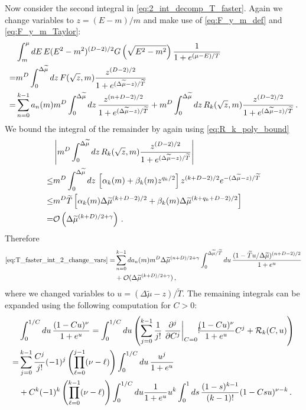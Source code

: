 \documentclass[sn-mathphys,Numbered]{sn-jnl}
\begin{document}
Now consider the second integral in \eqref{eq:2_int_decomp_T_faster}. Again we change variables to $z=(E-m)/m$ and make use of \eqref{eq:F_y_m_def} and \eqref{eq:F_y_m_Taylor}:
\begin{align}\label{eq:T_faster_int_2_change_vars} 
  &\int_m^{\mu} dE \,E(E^2-m^2)^{(D-2)/2} G\left(\sqrt{E^2-m^2}\right)\frac{1}{1+e^{(\mu-E)/T}} \\\notag
  =&m^{D}\int_0^{\Delta\widetilde{\mu}} dz \, F(\sqrt{z},m)\frac{z^{(D-2)/2}}{1+e^{(\Delta\widetilde{\mu}-z)/\widetilde{T}}}\notag\\
  =&\sum_{n=0}^{k-1} a_n(m)m^{D}\int_0^{\Delta\widetilde{\mu}} dz \,\frac{z^{(n+D-2)/2}}{1+e^{(\Delta\widetilde{\mu}-z)/\widetilde{T}}} +m^{D}\int_0^{\Delta\widetilde{\mu}} dz \,R_k(\sqrt{z},m)
\frac{z^{(D-2)/2}}{1+e^{(\Delta\widetilde{\mu}-z)/\widetilde{T}}}\notag\,.
\end{align}
We bound the integral of the remainder by again using \eqref{eq:R_k_poly_bound}
\begin{align}
 &\left|m^{D}\int_0^{\Delta\widetilde{\mu}} dz \,R_k(\sqrt{z},m)
\frac{z^{(D-2)/2}}{1+e^{(\Delta\widetilde{\mu}-z)/\widetilde{T}}}\right|\\
\leq&m^{D}\int_0^{\Delta\widetilde{\mu}} dz \,\left[\alpha_k(m)+\beta_k(m)z^{q_k/2}\right]z^{(k+D-2)/2}e^{-(\Delta\widetilde{\mu}-z)/\widetilde{T}}\notag\\
\leq &m^{D}\widetilde{T}\left[\alpha_k(m)\Delta\widetilde{\mu}^{(k+D-2)/2}+\beta_k(m)\Delta\widetilde{\mu}^{(k+q_k+D-2)/2}\right]\notag\\
=&\mathcal{O}\left(\Delta\widetilde{\mu}^{(k+D)/2+\gamma}\right)\,.\notag
\end{align}
Therefore 
\begin{align}    \label{eq:T_faster_int_2_expanded1}
    \eqref{eq:T_faster_int_2_change_vars} =&\sum_{n=0}^{k-1} da_n(m)m^{D}\Delta\widetilde{\mu}^{(n+D)/2+\gamma}\int^{\Delta\widetilde{\mu}/\widetilde{T}}_{0} du \,\frac{(1-\widetilde{T}u/\Delta\widetilde{\mu})^{(n+D-2)/2}}{1+e^{u}} \\
    &+\mathcal{O}(\Delta\widetilde{\mu}^{(k+D)/2+\gamma})\notag\,,
\end{align}
where we changed variables to $u=(\Delta\widetilde{\mu}-z)/\widetilde{T}$. The remaining integrals can be expanded using the following computation for $C>0$: 
\begin{align}
&\int_0^{1/C} du \,\frac{(1-Cu)^\nu}{1+e^u} = \int_0^{1/C} du\left(\sum_{j=0}^{k-1} \frac{1}{j!} \left. \frac{\partial^j}{\partial C^j}\right|_{C=0}!\!\!\frac{(1-Cu)^\nu}{1 + e^u} C^j + \mathcal{R}_k(C,u)\right)\\
=&\sum_{j=0}^{k-1}\frac{C^j}{j!}(-1)^j\left(\prod_{\ell=0}^{j-1}(\nu-\ell) \right)\int_0^{1/C} du \,\frac{u^j}{1+e^u}  \notag\\
&+ C^k (-1)^k\left(\prod_{\ell=0}^{k-1}(\nu-\ell)\right)\int_0^{1/C} du \frac{1}{1+e^u} u^k\int_0^1ds\,\frac{(1-s)^{k-1}}{(k-1)!} (1-Csu)^{\nu-k}\,.\notag
\end{align}
\end{document}
